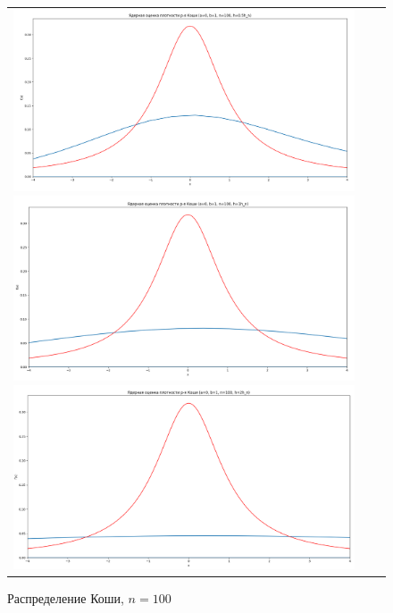 \begin{figure}[H]
	\begin{tabular}{ccc}
		\includegraphics[scale=0.14]{resources/4_cauchy_100_half.png}
		\includegraphics[scale=0.14]{resources/4_cauchy_100_one.png}
		\includegraphics[scale=0.14]{resources/4_cauchy_100_two.png}
	\end{tabular}
	\caption{Распределение Коши, $n=100$}
\end{figure}

